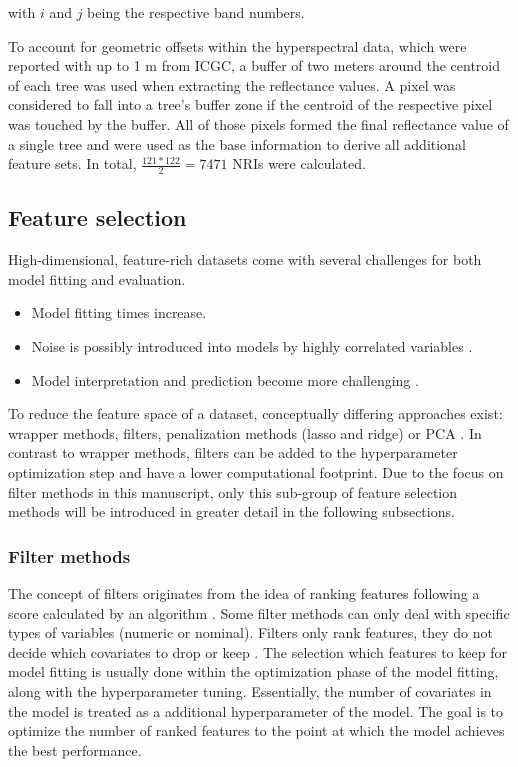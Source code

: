 \documentclass[letterpaper, peerreview, draftcls]{IEEEtran}
\begin{document}
\noindent
with \(i\) and \(j\) being the respective band numbers.

\bigbreak{}

To account for geometric offsets within the hyperspectral data, which were reported with up to 1 m from \ac{ICGC}, a buffer of two meters around the centroid of each tree was used when extracting the reflectance values.
A pixel was considered to fall into a tree's buffer zone if the centroid of the respective pixel was touched by the buffer.
All of those pixels formed the final reflectance value of a single tree and were used as the base information to derive all additional feature sets.
In total, \(\frac{121*122}{2} = 7471\) NRIs were calculated.

\subsection{Feature selection}

High-dimensional, feature-rich datasets come with several challenges for both model fitting and evaluation.

\begin{itemize}
	\item Model fitting times increase.
	\item Noise is possibly introduced into models by highly correlated variables \cite{johnstoneiainm.2009}.
	\item Model interpretation and prediction become more challenging \cite{johnstoneiainm.2009}.
\end{itemize}

To reduce the feature space of a dataset, conceptually differing approaches exist: wrapper methods, filters, penalization methods (lasso and ridge) or \ac{PCA} \cite{bommert2020, das2001, guyon2003, jolliffe2016}.
In contrast to wrapper methods, filters can be added to the hyperparameter optimization step and have a lower computational footprint.
Due to the focus on filter methods in this manuscript, only this sub-group of feature selection methods will be introduced in greater detail in the following subsections.

\subsubsection{Filter methods}

The concept of filters originates from the idea of ranking features following a score calculated by an algorithm \cite{guyon2003}.
Some filter methods can only deal with specific types of variables (numeric or nominal).
Filters only rank features, they do not decide which covariates to drop or keep \cite{drotar2015}.
The selection which features to keep for model fitting is usually done within the optimization phase of the model fitting, along with the hyperparameter tuning.
Essentially, the number of covariates in the model is treated as a additional hyperparameter of the model.
The goal is to optimize the number of ranked features to the point at which the model achieves the best performance.
\end{document}
